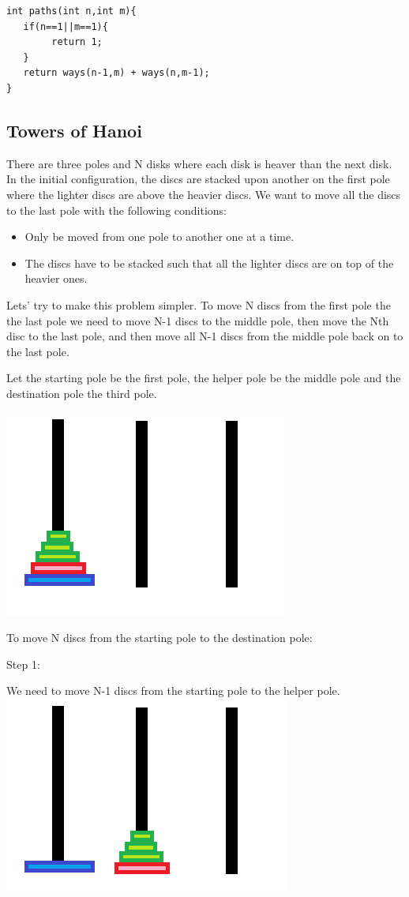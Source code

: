 \documentclass[11pt,oneside]{book}
\makeatletter
\def\maxwidth#1{\ifdim\Gin@nat@width>#1 #1\else\Gin@nat@width\fi}
\makeatother
\begin{document}
\begin{lstlisting}
int paths(int n,int m){
   if(n==1||m==1){
        return 1;
   }
   return ways(n-1,m) + ways(n,m-1);
}
\end{lstlisting}

\subsection{Towers of Hanoi}

There are three poles and N disks where each disk is heaver than the next disk. In the initial configuration, the discs are stacked upon another on the first pole where the lighter discs are above the heavier discs. We want to move all the discs to the last pole with the following conditions:

\begin{itemize}
\item Only be moved from one pole to another one at a time.
\item The discs have to be stacked such that all the lighter discs are on top of the heavier ones.
\end{itemize}

Lets' try to make this problem simpler. To move N discs from the first pole the the last pole we need to move N-1 discs to the middle pole, then move the Nth disc to the last pole, and then move all N-1 discs from the middle pole back on to the last pole.

Let the starting pole be the first pole, the helper pole be the middle pole and the destination pole the third pole.

\includegraphics[width=\maxwidth{\textwidth}]{hanoi.png}

To move N discs from the starting pole to the destination pole:

Step 1:

We need to move N-1 discs from the starting pole to the helper pole.
\includegraphics[width=\maxwidth{\textwidth}]{hanoi2.png}
\end{document}
